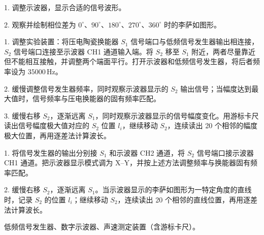 \documentclass[UTF8,a4paper,10pt,fontset=fandol]{ctexart}
\newcommand{\reportsection}[1]{\par\Needspace{4\baselineskip}\vspace{0.7\baselineskip}{\heiti #1}\par\vspace{0.15\baselineskip}}
\newcommand{\reportsubsection}[1]{\par\Needspace{3\baselineskip}\vspace{0.35\baselineskip}{\heiti #1}\par}
\begin{document}
\reportsection{实验内容}
\reportsubsection{预备实验：数字示波器观测相位差}
1. 调整示波器，显示合适的信号波形。\par
2. 观察并绘制相位差为 $0^\circ$、$90^\circ$、$180^\circ$、$270^\circ$、$360^\circ$ 时的李萨如图形。\par

\reportsubsection{共振干涉法}
1. 调整实验装置：将压电陶瓷换能器 $S_1$ 信号端口与低频信号发生器输出相连接，$S_2$ 信号端口连接至示波器 CH1 通道输入端。将 $S_2$ 移至 $S_1$ 附近，两者尽量靠近但不能相互接触，并调整两个端面平行。打开示波器和低频信号发生器，将后者频率设为 $35000\,\mathrm{Hz}$。\par
2. 缓慢调整信号发生器频率，同时观察示波器显示的 $S_2$ 输出信号；当幅度达到最大值时，信号频率与压电换能器的固有频率匹配。\par
3. 缓慢右移 $S_2$，逐渐远离 $S_1$，同时观察示波器显示的信号幅度变化。用游标卡尺读出信号幅度极大值对应的 $S_2$ 位置 $l_i$，继续移动 $S_2$，连续读出 20 个相邻的幅度极大位置，再用逐差法计算波长。\par

\reportsubsection{相位比较法}
1. 将信号发生器的输出分别接 $S_1$ 和示波器 CH2 通道，将 $S_2$ 信号端口接示波器 CH1 通道。把示波器显示模式调为 X--Y，并按上述方法调整频率与换能器固有频率匹配。\par
2. 缓慢右移 $S_2$，逐渐远离 $S_1$。当示波器显示的李萨如图形为一特定角度的直线时，记录 $S_2$ 的位置 $l_i$；继续移动 $S_2$，连续读出 20 个相邻的直线位置，再用逐差法计算波长。\par

\reportsection{实验仪器}
低频信号发生器、数字示波器、声速测定装置（含游标卡尺）。\par
\end{document}
